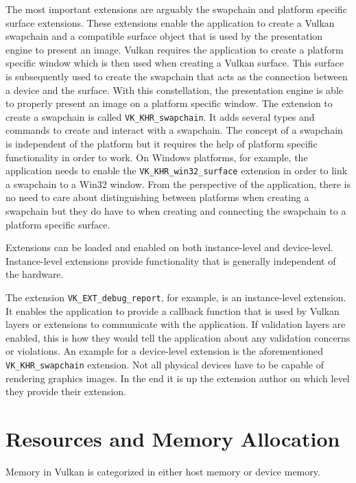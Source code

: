    The most important extensions are arguably the swapchain and platform specific surface extensions. These extensions enable the \gls{application} to create a Vulkan swapchain and a compatible surface object that is used by the presentation engine to present an image. Vulkan requires the \gls{application} to create a platform specific window which is then used when creating a Vulkan surface. This surface is subsequently used to create the swapchain that acts as the connection between a device and the surface. With this constellation, the presentation engine is able to properly present an image on a platform specific window. The extension to create a swapchain is called \lstinline{VK_KHR_swapchain}. It adds several types and commands to create and interact with a swapchain. The concept of a swapchain is independent of the platform but it requires the help of platform specific functionality in order to work. On Windows platforms, for example, the \gls{application} needs to enable the \lstinline{VK_KHR_win32_surface} extension in order to link a swapchain to a Win32 window. From the perspective of the \gls{application}, there is no need to care about distinguishing between platforms when creating a swapchain but they do have to when creating and connecting the swapchain to a platform specific surface.


    Extensions can be loaded and enabled on both instance-level and device-level. Instance-level extensions provide functionality that is generally independent of the hardware.

    The extension \lstinline{VK_EXT_debug_report}, for example, is an instance-level extension. It enables the \gls{application} to provide a callback function that is used by Vulkan layers or extensions to communicate with the \gls{application}. If validation layers are enabled, this is how they would tell the \gls{application} about any validation concerns or violations. An example for a device-level extension is the aforementioned \lstinline{VK_KHR_swapchain} extension. Not all physical \glspl{device} have to be capable of rendering graphics images. In the end it is up the extension author on which level they provide their extension.

  \section{Resources and Memory Allocation}
  \label{sec:MemoryManagement}
    Memory in Vulkan is categorized in either \gls{host} memory or \gls{device} memory.

